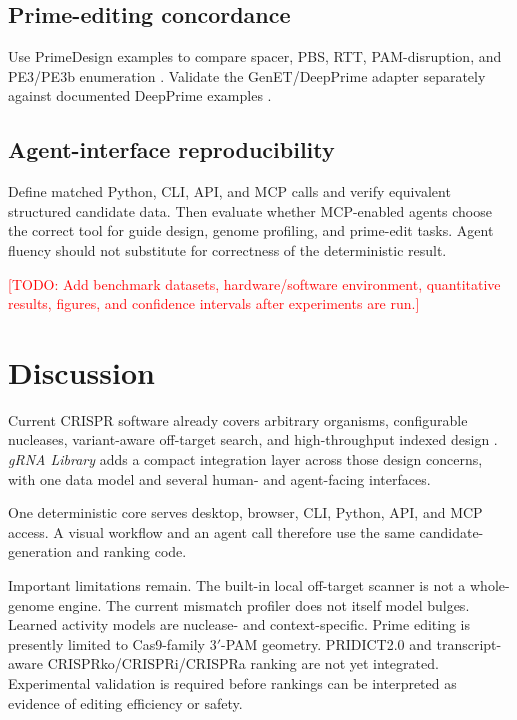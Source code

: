\documentclass[11pt]{article}
\newcommand{\grnalib}{\textit{gRNA Library}}
\newcommand{\todo}[1]{\textcolor{red}{[TODO: #1]}}
\begin{document}
\subsection{Prime-editing concordance}

Use PrimeDesign examples to compare spacer, PBS, RTT, PAM-disruption, and PE3/PE3b enumeration \citep{hsu2021primedesign}. Validate the GenET/DeepPrime adapter separately against documented DeepPrime examples \citep{yu2023deepprime}.

\subsection{Agent-interface reproducibility}

Define matched Python, CLI, API, and MCP calls and verify equivalent structured candidate data. Then evaluate whether MCP-enabled agents choose the correct tool for guide design, genome profiling, and prime-edit tasks. Agent fluency should not substitute for correctness of the deterministic result.

\todo{Add benchmark datasets, hardware/software environment, quantitative results, figures, and confidence intervals after experiments are run.}

\section{Discussion}

Current CRISPR software already covers arbitrary organisms, configurable nucleases, variant-aware off-target search, and high-throughput indexed design \citep{hoberecht2022crisprverse,schmidt2025guidescan2,cancellieri2020crispritz,bae2014casoffinder,malekos2025crisprware}. \grnalib{} adds a compact integration layer across those design concerns, with one data model and several human- and agent-facing interfaces.

One deterministic core serves desktop, browser, CLI, Python, API, and MCP access. A visual workflow and an agent call therefore use the same candidate-generation and ranking code.

Important limitations remain. The built-in local off-target scanner is not a whole-genome engine. The current mismatch profiler does not itself model bulges. Learned activity models are nuclease- and context-specific. Prime editing is presently limited to Cas9-family 3$'$-PAM geometry. PRIDICT2.0 and transcript-aware CRISPRko/CRISPRi/CRISPRa ranking are not yet integrated. Experimental validation is required before rankings can be interpreted as evidence of editing efficiency or safety.
\end{document}
